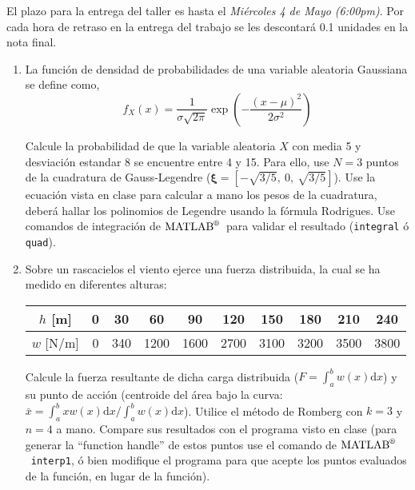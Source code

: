 \documentclass[letterpaper,12pt]{exam}
\newcommand{\matlab}{$\text{MATLAB}^{\text{\textregistered}}$~}
\begin{document}
\begin{center}
\end{center}

\vspace{1cm}
\noindent El plazo para la entrega del taller es hasta el \emph{Miércoles 4 de Mayo (6:00pm)}. Por cada hora de retraso en la entrega del trabajo se les descontará 0.1 unidades en la nota final. 

\begin{enumerate}

 \item La función de densidad de probabilidades de una variable aleatoria Gaussiana se define como,
 \begin{equation}
  f_{X}(x) = \frac{1}{\sigma\sqrt{2\pi}}\exp\left(-\frac{(x-\mu)^2}{2\sigma^2}\right)
 \end{equation}
 
 Calcule la probabilidad de que la variable aleatoria $X$ con media 5 y desviación estandar 8 se encuentre entre 4 y 15. Para ello, use $N = 3$ puntos de la cuadratura de Gauss-Legendre ($\boldsymbol{\xi} = [-\sqrt{3/5},~0,~\sqrt{3/5}]$). Use la ecuación vista en clase para calcular a mano los pesos de la cuadratura, deberá hallar los polinomios de Legendre usando la fórmula Rodrigues. Use comandos de integración de \matlab para validar el resultado (\texttt{integral} ó \texttt{quad}).

 \item Sobre un rascacielos el viento ejerce una fuerza distribuida, la cual se ha medido en diferentes alturas:
 \begin{table}[!hb]
  \centering
  \begin{tabular}{c|ccccccccc}
   $h$ [m]   & 0 & 30  & 60   & 90   & 120  & 150  & 180  & 210  & 240 \\
   \hline
   $w$ [N/m] & 0 & 340 & 1200 & 1600 & 2700 & 3100 & 3200 & 3500 & 3800
  \end{tabular}
 \end{table}
 
 Calcule la fuerza resultante de dicha carga distribuida ($F = \int_{a}^{b} w(x)\mathrm{d}x$) y su punto de acción (centroide del área bajo la curva: $\bar{x}=\int_{a}^{b} x w(x)\mathrm{d}x/\int_{a}^{b} w(x)\mathrm{d}x$). Utilice el método de Romberg con $k=3$ y $n=4$ a mano. Compare sus resultados con el programa visto en clase (para generar la ``function handle'' de estos puntos use el comando de \matlab \texttt{interp1}, ó bien modifique el programa para que acepte los puntos evaluados de la función, en lugar de la función).



\end{enumerate}
\end{document}
